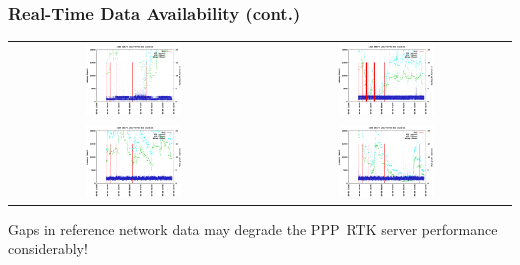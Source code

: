 \documentclass[10pt]{beamer}
\begin{document}
\begin{frame}
  \frametitle{Real-Time Data Availability (cont.)}
  \begin{tabular}{cc}
  \includegraphics[width=0.4\textwidth]{100A_lat.png} &
  \includegraphics[width=0.4\textwidth]{101A_lat.png} \\
  \includegraphics[width=0.4\textwidth]{102A_lat.png} &
  \includegraphics[width=0.4\textwidth]{104A_lat.png}
  \end{tabular}

  Gaps in reference network data may degrade the PPP~RTK server performance
  considerably!
\end{frame}

\end{document}

